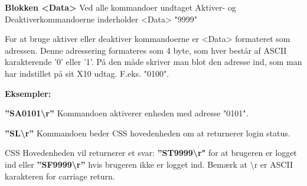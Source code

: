\textbf{Blokken <Data>}
Ved alle kommandoer undtaget Aktiver- og Deaktiverkommandoerne inderholder <Data> "9999"

For at bruge aktiver eller deaktiver kommandoerne er <Data> formateret som adressen. Denne adressering formateres som 4 byte, som hver består af ASCII karakterende '0' eller '1'. På den måde skriver man blot den adresse ind, som man har indstillet på sit X10 udtag. F.eks. "0100".

\textbf{Eksempler:}

\textbf{''SA0101\textbackslash r''}
Kommandoen aktiverer enheden med adresse "0101".

\textbf{''SL\textbackslash r''}
Kommandoen beder CSS hovedenheden om at returnerer login status.

CSS Hovedenheden vil returnerer et svar:
\textbf{''ST9999\textbackslash r"} for at brugeren er logget ind eller \textbf{''SF9999\textbackslash r''} hvis brugeren ikke er logget ind. Bemærk at \textbackslash r er ASCII karakteren for carriage return.
